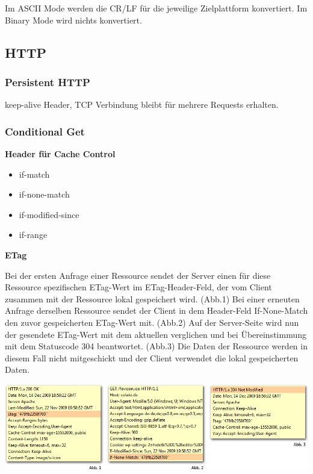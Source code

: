 Im ASCII Mode werden die CR/LF für die jeweilige Zielplattform konvertiert. Im
Binary Mode wird nichts konvertiert.

\subsection{HTTP}

\subsubsection{Persistent HTTP}

keep-alive Header, TCP Verbindung bleibt für mehrere Requests erhalten.

\subsubsection{Conditional Get}

\textbf{Header für Cache Control}

\begin{itemize}
	\item if-match
	\item if-none-match
	\item if-modified-since
	\item if-range
\end{itemize}

\textbf{ETag}

Bei der ersten Anfrage einer Ressource sendet der Server einen für diese
Ressource spezifischen ETag-Wert im ETag-Header-Feld, der vom Client zusammen
mit der Ressource lokal gespeichert wird. (Abb.1) Bei einer erneuten Anfrage
derselben Ressource sendet der Client in dem Header-Feld If-None-Match den zuvor
gespeicherten ETag-Wert mit. (Abb.2) Auf der Server-Seite wird nun der gesendete
ETag-Wert mit dem aktuellen verglichen und bei Übereinstimmung mit dem
Statuscode 304 beantwortet. (Abb.3) Die Daten der Ressource werden in diesem
Fall nicht mitgeschickt und der Client verwendet die lokal gespeicherten
Daten.

\includegraphics[width=\textwidth]{media/etag_beispiele.png}
